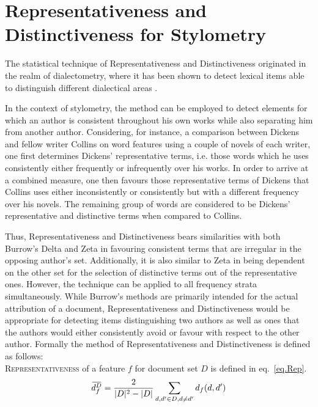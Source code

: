 \documentclass[a4paper,10pt,twoside,fleqn]{article}
\newcommand{\overbar}[1]{\mkern 2.0mu\overline{\mkern-2.0mu#1\mkern-2.0mu}\mkern 2.0mu}
\begin{document}
\section{Representativeness and Distinctiveness for Stylometry} \label{sec:method}
The statistical technique of Representativeness and Distinctiveness
originated in the realm of dialectometry, where it has been
shown to detect lexical items able to distinguish different dialectical 
areas \cite{prokic2012detecting}.

In the context of stylometry, the method can be employed to detect elements for 
which an author is consistent throughout his own works while also separating him 
from another author. 
Considering, for instance, a comparison between Dickens and fellow 
writer Collins on word features using a couple of novels of each writer, 
one first determines Dickens' representative terms, i.e. those words which he
uses consistently either frequently or infrequently over his works. 
In order to arrive at a combined measure, one then favours those representative 
terms of Dickens that Collins uses either inconsistently or consistently but with a
different frequency over his novels. The remaining group of words are considered 
to be Dickens' representative and distinctive terms when compared to Collins. 

Thus, Representativeness and Distinctiveness bears similarities with both 
Burrow's Delta \cite{Burrows2002delta} and Zeta  \cite{Burrows2007all} in
favouring consistent terms that are irregular in the opposing author's set. 
Additionally, it is also similar to Zeta in being dependent on the other set 
for the selection of distinctive terms out of the representative ones. 
However, the technique can be applied to all frequency strata simultaneously.
While Burrow's methods are primarily intended for the actual attribution
of a document, Representativeness and Distinctiveness would be appropriate
for detecting items distinguishing two authors as well as ones that 
the authors would either consistently avoid or favour with respect to 
the other author. 
Formally the method of Representativeness and Distinctiveness is defined 
as follows: \\

\textsc{Representativeness} of a feature $f$ for document set $D$ is defined 
in eq.~\ref{eq.Rep}. \\


 \begin{equation}\label{eq.Rep}
 \overbar{d_f^{D}} = \frac{2}{|D|^2 -|D|} \sum\limits_{d,d' \in D,d \neq d'} d_f(d,d')
 \end{equation}
 
\end{document}
